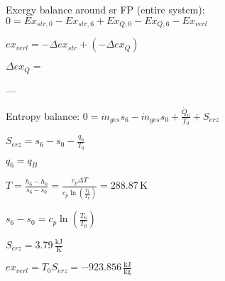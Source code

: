 Exergy balance around sr FP (entire system):  
\( 0 = Ex_{str,0} - Ex_{str,6} + Ex_{Q,0} - Ex_{Q,6} - Ex_{verl} \)  

\( ex_{verl} = -\Delta ex_{str} + (-\Delta ex_{Q}) \)  

\( \Delta ex_{Q} = \)  

---

Entropy balance:  
\( 0 = \dot{m}_{ges} s_6 - \dot{m}_{ges} s_0 + \frac{\dot{Q}_0}{T_0} + S_{erz} \)  

\( S_{erz} = s_6 - s_0 - \frac{q_6}{T_0} \)  

\( q_6 = q_B \)  

\( T = \frac{h_6 - h_0}{s_6 - s_0} = \frac{c_p \Delta T}{c_p \ln(\frac{T_6}{T_0})} = 288.87 \, \text{K} \)  

\( s_6 - s_0 = c_p \ln(\frac{T_6}{T_0}) \)  

\( S_{erz} = 3.79 \, \frac{\text{kJ}}{\text{K}} \)  

\( ex_{verl} = T_0 S_{erz} = -923.856 \, \frac{\text{kJ}}{\text{kg}} \)